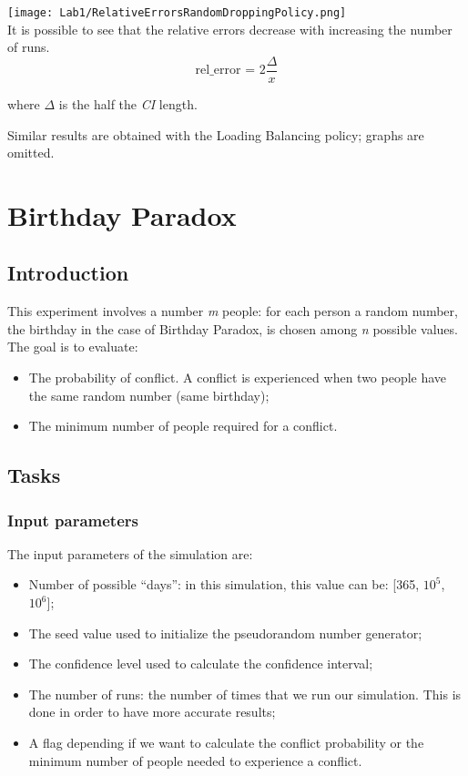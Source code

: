 \documentclass[twocolumn,letterpaper]{report}
\begin{document}
{			\texttt{[image: Lab1/RelativeErrorsRandomDroppingPolicy.png]} \\
			It is possible to see that the relative errors decrease with increasing the number of runs. 
			\begin{equation}\label{eq:3}
				 \text{rel\_error = }2\frac{\Delta}{x}
			\end{equation}
			\begin{center}
					where $\Delta$ is the half the \emph{CI} length.
			\end{center}
			Similar results are obtained with the Loading Balancing policy; graphs are omitted.
					
			
\chapter{Birthday Paradox}
	 
	 \section{Introduction}
	 
	This experiment involves a number \emph{m} people: for each person a random number, the birthday in the case of Birthday Paradox, is chosen among \emph{n} possible values. \\
	The goal is to evaluate:
	\begin{itemize}
		\item The probability of conflict. A conflict is experienced when two people have the same random number (same birthday);
		\item The minimum number of people required for a conflict.
	\end{itemize}

	\section{Tasks}
	 
		\subsection{Input parameters}
			The input parameters of the simulation are:
			\begin{itemize}
				\item Number of possible ``days'': in this simulation, this value can be: [365, $10^5$, $10^6$];
				\item The seed value used to initialize the pseudorandom number generator;
				\item The confidence level used to calculate the confidence interval;
				\item The number of runs: the number of times that we run our simulation. This is done in order to have more accurate results;
				\item A flag depending if we want to calculate the conflict probability or the minimum number of people needed to experience a conflict.
			\end{itemize}
			 
}
\end{document}
